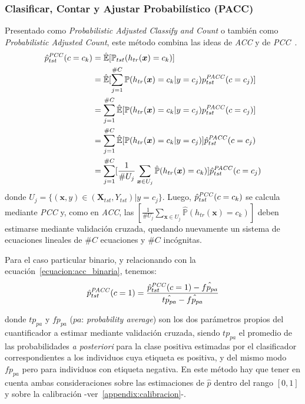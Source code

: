 \subsubsection{Clasificar, Contar y Ajustar Probabilístico
(PACC)}\label{estimacion:pacc}

Presentado como {\it Probabilistic Adjusted Classify and Count\/} o también como
{\it Probabilistic Adjusted Count}, este método combina las ideas de {\it ACC\/}
y de {\it PCC\/}~\cite{bella2010quantification, tang2010network}.
\begin{align}
\begin{split}
    \hat p^{\it PCC\/}_{tst}(c=c_k) &= \mathbb{\hat E}[\mathbb{P}_{tst}(h_{tr}(\boldsymbol{x})=c_k)] \\
    &= \mathbb{\hat E}[\sum \limits_{j=1}^{\#C}{\mathbb{P}(h_{tr}(\boldsymbol{x})=c_k|y=c_j) p^{\it PACC\/}_{tst}(c=c_j)}] \\
    &= \sum \limits_{j=1}^{\#C}\mathbb{\hat E}[{\mathbb{P}(h_{tr}(\boldsymbol{x})=c_k|y=c_j) p^{\it PACC\/}_{tst}(c=c_j)}] \\
    &= \sum \limits_{j=1}^{\#C}\mathbb{\hat E}[{\mathbb{P}(h_{tr}(\boldsymbol{x})=c_k|y=c_j)}] \hat p^{\it PACC\/}_{tst}(c=c_j) \\
    &= \sum \limits_{j=1}^{\#C} [\frac {1}{\#U_j} \sum_{\boldsymbol{x} \in U_j} \mathbb{\hat P}(h_{tr}(\boldsymbol{x})=c_k)] \hat p^{\it PACC\/}_{tst}(c=c_j)
\end{split}
\end{align}
donde \(U_j=\{(\boldsymbol{x}, y) \in (\boldsymbol{X}_{tst}, Y_{tst}) |
y=c_j\}\). Luego, \(\hat p^{\it PCC\/}_{tst}(c=c_k)\) se calcula mediante {\it
PCC\/} y, como en {\it ACC}, las \([\frac {1}{\#U_j} \sum_{\boldsymbol{x} \in
U_j} \mathbb{\hat{P}}(h_{tr}(\boldsymbol{x})=c_k)]\) deben estimarse mediante
validación cruzada, quedando nuevamente un sistema de ecuaciones lineales de
\(\#C\) ecuaciones y \(\#C\) incógnitas.

Para el caso particular binario, y relacionando con la
ecuación~\ref{ecuacion:acc_binaria}, tenemos:
\begin{equation}
    \hat p^{\it PACC\/}_{tst}(c=1) = \frac{\hat p^{\it PCC\/}_{tst}(c=1)-\hat{fp_{pa}}}{\hat{tp_{pa}}-\hat{fp_{pa}}}
\end{equation}

donde \(tp_{pa}\) y \(fp_{pa}\) ($pa$: {\it probability average\/}) son los dos
parámetros propios del cuantificador a estimar mediante validación cruzada,
siendo \(tp_{pa}\) el promedio de las probabilidades {\it a posteriori\/} para
la clase positiva estimadas por el clasificador correspondientes a los
individuos cuya etiqueta es positiva, y del mismo modo \(fp_{pa}\) pero para
individuos con etiqueta negativa. En este método hay que tener en cuenta ambas
consideraciones sobre las estimaciones de \(\hat p\) dentro del rango \([0, 1]\)
y sobre la calibración -ver~\ref{appendix:calibracion}-.

